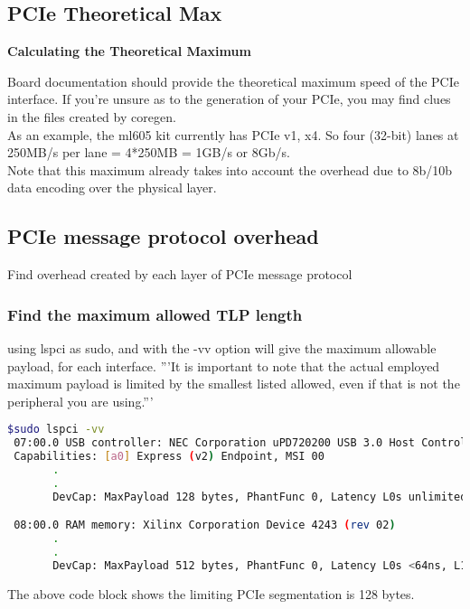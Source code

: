 \subsection{PCIe Theoretical Max}
\textbf{Calculating the Theoretical Maximum}

Board documentation should provide the theoretical maximum speed of the PCIe interface.  If you're unsure as to the generation of your PCIe, you may find clues in the files created by coregen. \\

As an example, the ml605 kit currently has PCIe v1, x4.  So four (32-bit) lanes at 250MB/s per lane = 4*250MB = 1GB/s or 8Gb/s. \\

Note that this maximum already takes into account the overhead due to 8b/10b data encoding over the physical layer.\\

\subsection{PCIe message protocol overhead}
Find overhead created by each layer of PCIe message protocol


\subsubsection{Find the maximum allowed TLP length}
 using lspci as sudo, and with the -vv option will give the maximum allowable payload, for each interface.  '''It is important to note that the actual employed maximum payload is limited by the smallest listed allowed, even if that is not the peripheral you are using.'''

\begin{lstlisting}[language=bash]
$sudo lspci -vv
 07:00.0 USB controller: NEC Corporation uPD720200 USB 3.0 Host Controller (rev 04) (prog-if 30 [XHCI])
 Capabilities: [a0] Express (v2) Endpoint, MSI 00  
       .
       .                                                   
       DevCap: MaxPayload 128 bytes, PhantFunc 0, Latency L0s unlimited, L1 unlimited

 08:00.0 RAM memory: Xilinx Corporation Device 4243 (rev 02)
       .
       .  
       DevCap: MaxPayload 512 bytes, PhantFunc 0, Latency L0s <64ns, L1 unlimited
\end{lstlisting}



The above code block shows the limiting PCIe segmentation is 128 bytes. 

